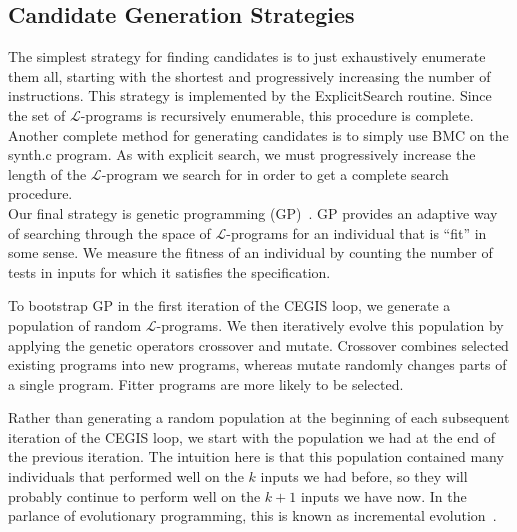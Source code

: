 \documentclass[preprint]{sigplanconf}
\theoremstyle{definition}
\begin{document}
\subsection{Candidate Generation Strategies}
 The simplest strategy for finding candidates
is to just exhaustively enumerate them all, starting with the shortest and
progressively increasing the number of instructions.  This strategy
is implemented by the {\sc ExplicitSearch} routine.  Since the set of
$\mathcal{L}$-programs is recursively enumerable, this procedure is complete.
\\

 Another complete method for generating
candidates is to simply use BMC on the {\sc synth.c} program.  As with explicit
search, we must progressively increase the length of the $\mathcal{L}$-program we search for
in order to get a complete search procedure.
\\

 \label{sec:gp}
Our final strategy is genetic programming
(GP)~\cite{langdon:fogp,brameier2007linear}.  GP provides an adaptive way of
searching through the space of $\mathcal{L}$-programs for an individual
that is ``fit'' in some sense.  We measure the
fitness of an individual by counting the number of tests in {\sc inputs}
for which it satisfies the specification.

To bootstrap GP in the first iteration of the CEGIS loop, we generate a population
of random $\mathcal{L}$-programs. We then iteratively evolve this population by
applying the genetic operators {\sc crossover} and {\sc mutate}.
{\sc Crossover} combines selected existing programs into new programs,
whereas {\sc mutate} randomly changes parts of a single program.
Fitter programs are more likely to be selected.




Rather than generating a random population at the beginning of each subsequent
iteration of the CEGIS loop, we start with the population we had at the end of the
previous iteration.  The intuition here is that this population contained
many individuals that performed well on the $k$ inputs we had before, so
they will probably continue to perform well on the $k+1$ inputs we have now.
In the parlance of evolutionary programming, this is known as
incremental evolution~\cite{Gomez97incrementalevolution}.
\end{document}
